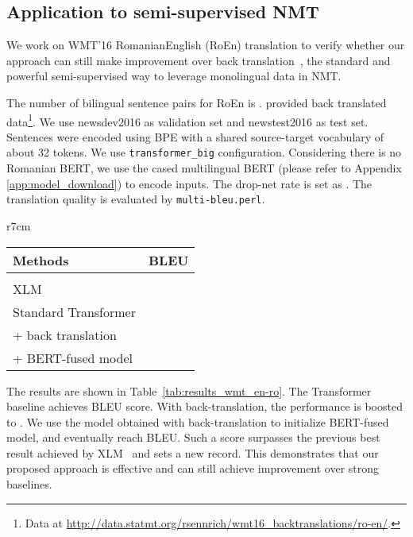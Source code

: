 \documentclass{article} \usepackage{iclr2020_conference,times}
\begin{document}
\subsection{Application to semi-supervised NMT}\label{sec:semisupervised_nmt}
We work on WMT'16 RomanianEnglish (RoEn) translation to verify whether our approach can still make improvement over back translation~\citep{sennrich2016improving}, the standard and powerful semi-supervised way to leverage monolingual data in NMT.

The number of bilingual sentence pairs for RoEn is . \cite{sennrich2016edinburgh} provided  back translated data\footnote{Data at \url{http://data.statmt.org/rsennrich/wmt16_backtranslations/ro-en/}.}. We use newsdev2016 as validation set and newstest2016 as test set. Sentences were encoded using BPE with a shared source-target vocabulary of about 32 tokens. We use \texttt{transformer\_big} configuration. Considering there is no Romanian BERT, we use the cased multilingual BERT (please refer to Appendix \ref{app:model_download}) to encode inputs. The drop-net rate  is set as . The translation quality is evaluated by  \texttt{multi-bleu.perl}.

\begin{wraptable}{r}{7cm}
\vspace{-0.8cm}
\centering
\caption{BLEU scores of WMT'16 RoEn.}
\begin{tabular}{lc}
\toprule
Methods& BLEU\\
\midrule
\citet{sennrich2016edinburgh}&  \\
XLM~\citep{lample2019cross} &  \\
\midrule
Standard Transformer &   \\
+ back translation &  \\
+ BERT-fused model &  \\
\bottomrule
\end{tabular}
\label{tab:results_wmt_en-ro}
\vspace{-0.3cm}
\end{wraptable}


The results are shown in Table~\ref{tab:results_wmt_en-ro}. The Transformer baseline achieves  BLEU score. With back-translation, the performance is boosted to . We use the model obtained with back-translation to initialize BERT-fused model, and eventually reach  BLEU. Such a score surpasses the previous best result  achieved by XLM~\citep{lample2019cross} and sets a new record. This demonstrates that  our proposed approach is effective and can still achieve improvement over strong baselines.
\end{document}

